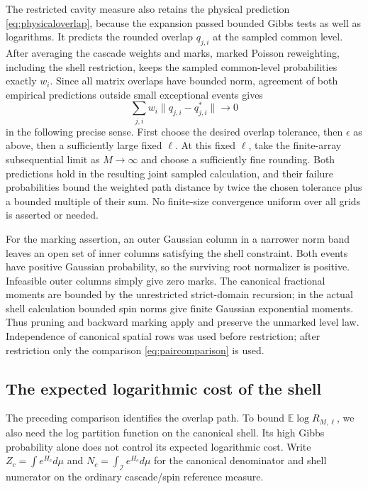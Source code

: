 \documentclass[11pt]{article}
\numberwithin{equation}{section}
\theoremstyle{definition}
\newcommand{\E}{\mathbb E}
\newcommand{\norm}[1]{\lVert #1\rVert}
\begin{document}
The restricted cavity measure also retains the physical prediction \eqref{eq:physicaloverlap}, because the expansion passed bounded Gibbs tests as well as logarithms. It predicts the rounded overlap $q_{j,i}$ at the sampled common level. After averaging the cascade weights and marks, marked Poisson reweighting, including the shell restriction, keeps the sampled common-level probabilities exactly $w_i$. Since all matrix overlaps have bounded norm, agreement of both empirical predictions outside small exceptional events gives
\begin{equation}\label{eq:overlapconsistency}
\sum_{j,i}w_i\norm{q_{j,i}-q^*_{j,i}}\longrightarrow0
\end{equation}
in the following precise sense. First choose the desired overlap tolerance, then $\epsilon$ as above, then a sufficiently large fixed $\ell$. At this fixed $\ell$, take the finite-array subsequential limit as $M\to\infty$ and choose a sufficiently fine rounding. Both predictions hold in the resulting joint sampled calculation, and their failure probabilities bound the weighted path distance by twice the chosen tolerance plus a bounded multiple of their sum. No finite-size convergence uniform over all grids is asserted or needed.

For the marking assertion, an outer Gaussian column in a narrower norm band leaves an open set of inner columns satisfying the shell constraint. Both events have positive Gaussian probability, so the surviving root normalizer is positive. Infeasible outer columns simply give zero marks. The canonical fractional moments are bounded by the unrestricted strict-domain recursion; in the actual shell calculation bounded spin norms give finite Gaussian exponential moments. Thus pruning and backward marking apply and preserve the unmarked level law. Independence of canonical spatial rows was used before restriction; after restriction only the comparison \eqref{eq:paircomparison} is used.

\subsection{The expected logarithmic cost of the shell}
The preceding comparison identifies the overlap path. To bound $\E\log R_{M,\ell}$, we also need the log partition function on the canonical shell. Its high Gibbs probability alone does not control its expected logarithmic cost. Write $Z_c=\int e^{H_c}d\mu$ and $N_c=\int_{\mathcal I}e^{H_c}d\mu$ for the canonical denominator and shell numerator on the ordinary cascade/spin reference measure.
\end{document}
